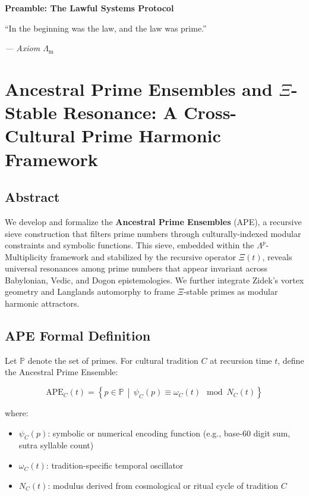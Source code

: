 \documentclass[12]{amsart}
\theoremstyle{plain}
\begin{document}
\clearpage
\clearpage
\thispagestyle{empty}
\begin{center}
    \Large\textbf{Preamble: The Lawful Systems Protocol}
\end{center}

\vspace{2em}

\epigraph{“In the beginning was the law, and the law was prime.”
}{\textit{— Axiom $\Lambda_{\mathrm{m}}$}}

\vspace{1em}


\section{Ancestral Prime Ensembles and $\Xi$-Stable Resonance: A Cross-Cultural Prime Harmonic Framework}

\subsection{Abstract}

We develop and formalize the \textbf{Ancestral Prime Ensembles} (APE), a recursive sieve construction that filters prime numbers through culturally-indexed modular constraints and symbolic functions. This sieve, embedded within the $\Lambda^p$-Multiplicity framework and stabilized by the recursive operator $\Xi(t)$, reveals universal resonances among prime numbers that appear invariant across Babylonian, Vedic, and Dogon epistemologies. We further integrate Zidek’s vortex geometry and Langlands automorphy to frame $\Xi$-stable primes as modular harmonic attractors.

\subsection{APE Formal Definition}

Let $\mathbb{P}$ denote the set of primes. For cultural tradition $C$ at recursion time $t$, define the Ancestral Prime Ensemble:

\[
\text{APE}_C(t) = \left\{ p \in \mathbb{P} \,\middle|\, \psi_C(p) \equiv \omega_C(t) \mod N_C(t) \right\}
\]

where:
\begin{itemize}
    \item $\psi_C(p)$: symbolic or numerical encoding function (e.g., base-60 digit sum, sutra syllable count)
    \item $\omega_C(t)$: tradition-specific temporal oscillator
    \item $N_C(t)$: modulus derived from cosmological or ritual cycle of tradition $C$
\end{itemize}
\end{document}
